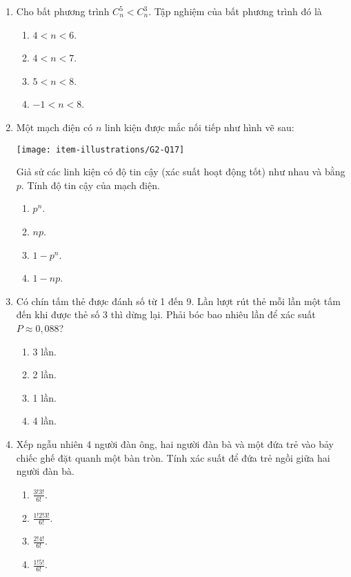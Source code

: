 \begin{enumerate}[label=\textbf{Câu \arabic*.},align=left,left=0cm..0cm,itemindent=*]
\begin{enumerate}[label=\textbf{\Alph*.},align=left,left=1cm..0cm,itemindent=*]
	\end{enumerate}
	\item Cho bất phương trình $C_{n}^{5}<C_{n}^{3}$. Tập nghiệm của bất phương trình đó là
	\begin{enumerate}[label=\textbf{\Alph*.},align=left,left=1cm..0cm,itemindent=*]
		\item $4<n<6$. \item $4<n<7$. \item $5<n<8$. \item $-1<n<8$.
	\end{enumerate}
	\item Một mạch điện có $n$ linh kiện được mắc nối tiếp như hình vẽ sau:\par
	{\centering\texttt{[image: item-illustrations/G2-Q17]}\par}
	Giả sử các linh kiện có độ tin cậy (xác suất hoạt động tốt) như nhau và bằng $p$. Tính độ tin cậy của mạch điện.
	\begin{enumerate}[label=\textbf{\Alph*.},align=left,left=1cm..0cm,itemindent=*]
		\item $p^n$. \item $np$. \item $1-p^n$. \item $1-np$.
	\end{enumerate}
	\item Có chín tấm thẻ được đánh số từ 1 đến 9. Lần lượt rút thẻ mỗi lần một tấm đến khi được thẻ số 3 thì dừng lại. Phải bóc bao nhiêu lần để xác suất $P\approx 0,088$?
	\begin{enumerate}[label=\textbf{\Alph*.},align=left,left=1cm..0cm,itemindent=*]
		\item 3 lần. \item 2 lần. \item 1 lần. \item 4 lần.
	\end{enumerate}
	\item Xếp ngẫu nhiên 4 người đàn ông, hai người đàn bà và một đứa trẻ vào bảy chiếc ghế đặt quanh một bàn tròn. Tính xác suất để đứa trẻ ngồi giữa hai người đàn bà.
	\begin{enumerate}[label=\textbf{\Alph*.},align=left,left=1cm..0cm,itemindent=*]
		\item $\frac{3!3!}{6!}$. \item $\frac{1!2!3!}{6!}$. \item $\frac{2!4!}{6!}$. \item $\frac{1!5!}{6!}$.
	\end{enumerate}

\end{enumerate}
